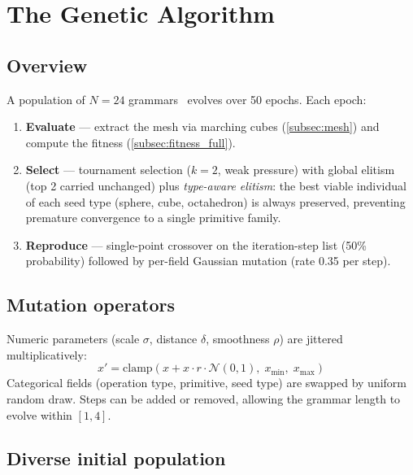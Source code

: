 \documentclass[11pt, a4paper]{article}
\newcommand{\term}[1]{\emph{#1}}
\begin{document}
\section{The Genetic Algorithm}
\label{sec:ga}

\subsection{Overview}
\label{subsec:ga_overview}

A population of $N=24$ grammars~\cite{holland1975adaptation} evolves over 50
epochs. Each epoch:

\begin{enumerate}[leftmargin=1.8em]
  \item \textbf{Evaluate} — extract the mesh via marching cubes
        (\autoref{subsec:mesh}) and compute the fitness
        (\autoref{subsec:fitness_full}).
  \item \textbf{Select} — tournament selection ($k=2$, weak pressure) with
        global elitism (top 2 carried unchanged) plus \term{type-aware elitism}:
        the best viable individual of each seed type (sphere, cube, octahedron)
        is always preserved, preventing premature convergence to a single
        primitive family.
  \item \textbf{Reproduce} — single-point crossover on the iteration-step
        list (50\% probability) followed by per-field Gaussian mutation
        (rate 0.35 per step).
\end{enumerate}

\subsection{Mutation operators}
\label{subsec:mutation}

Numeric parameters (scale $\sigma$, distance $\delta$, smoothness $\rho$)
are jittered multiplicatively:
\[
  x' = \mathrm{clamp}\!\left(x + x \cdot r \cdot \mathcal{N}(0,1),\; x_{\min},\; x_{\max}\right)
\]
Categorical fields (operation type, primitive, seed type) are swapped by
uniform random draw.
Steps can be added or removed, allowing the grammar length to evolve within
$[1, 4]$.

\subsection{Diverse initial population}
\label{subsec:init}
\end{document}
